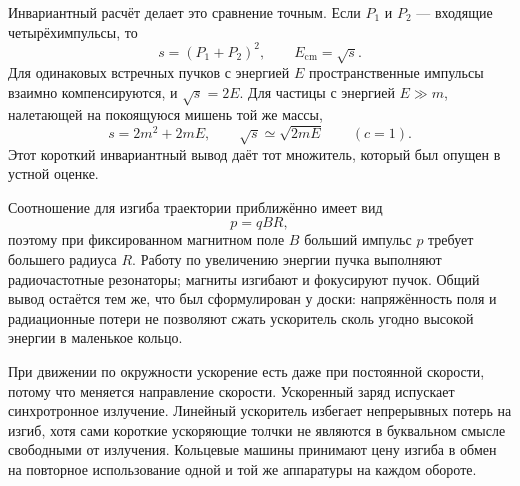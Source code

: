 Инвариантный расчёт делает это сравнение точным. Если \(P_1\) и \(P_2\) — входящие четырёхимпульсы, то
\begin{equation}
s=(P_1+P_2)^2,
\qquad E_{\mathrm{cm}}=\sqrt{s}.
\end{equation}
Для одинаковых встречных пучков с энергией \(E\) пространственные импульсы взаимно компенсируются, и \(\sqrt{s}=2E\). Для частицы с энергией \(E\gg m\), налетающей на покоящуюся мишень той же массы,
\begin{equation}
s=2m^2+2mE,
\qquad
\sqrt{s}\simeq \sqrt{2mE}
\qquad (c=1).
\end{equation}
Этот короткий инвариантный вывод даёт тот множитель, который был опущен в устной оценке.

\begin{classroomqa}
\end{classroomqa}

Соотношение для изгиба траектории приближённо имеет вид
\begin{equation}
p=qBR,
\end{equation}
поэтому при фиксированном магнитном поле \(B\) больший импульс \(p\) требует большего радиуса \(R\). Работу по увеличению энергии пучка выполняют радиочастотные резонаторы; магниты изгибают и фокусируют пучок. Общий вывод остаётся тем же, что был сформулирован у доски: напряжённость поля и радиационные потери не позволяют сжать ускоритель сколь угодно высокой энергии в маленькое кольцо.

При движении по окружности ускорение есть даже при постоянной скорости, потому что меняется направление скорости. Ускоренный заряд испускает синхротронное излучение. Линейный ускоритель избегает непрерывных потерь на изгиб, хотя сами короткие ускоряющие толчки не являются в буквальном смысле свободными от излучения. Кольцевые машины принимают цену изгиба в обмен на повторное использование одной и той же аппаратуры на каждом обороте.


